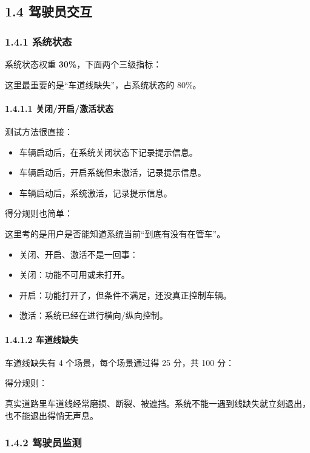 \subsection{1.4 驾驶员交互}

\subsubsection{1.4.1 系统状态}

系统状态权重 \textbf{30\%}，下面两个三级指标：

这里最重要的是“车道线缺失”，占系统状态的 80\%。

\paragraph{1.4.1.1 关闭/开启/激活状态}

测试方法很直接：

\begin{itemize}
  \item 车辆启动后，在系统关闭状态下记录提示信息。
  \item 车辆启动后，开启系统但未激活，记录提示信息。
  \item 车辆启动后，系统激活，记录提示信息。
\end{itemize}

得分规则也简单：

这里考的是用户是否能知道系统当前“到底有没有在管车”。

\begin{itemize}
  \item 关闭、开启、激活不是一回事：
  \item 关闭：功能不可用或未打开。
  \item 开启：功能打开了，但条件不满足，还没真正控制车辆。
  \item 激活：系统已经在进行横向/纵向控制。
\end{itemize}

\paragraph{1.4.1.2 车道线缺失}

车道线缺失有 4 个场景，每个场景通过得 25 分，共 100 分：

得分规则：

真实道路里车道线经常磨损、断裂、被遮挡。系统不能一遇到线缺失就立刻退出，也不能退出得悄无声息。

\subsubsection{1.4.2 驾驶员监测}

